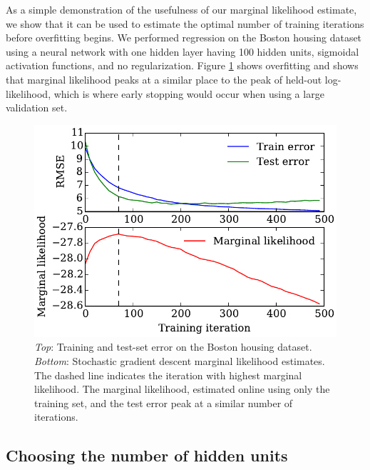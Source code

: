\documentclass[]{article}
\begin{document}
As a simple demonstration of the usefulness of our marginal likelihood estimate, we show that it can be used to estimate the optimal number of training iterations before overfitting begins.
We performed regression on the Boston housing dataset 
using a neural network with one hidden layer having 100 hidden units, sigmoidal activation functions, and no regularization.
Figure \ref{fig:housing} shows overfitting and shows that marginal likelihood peaks at a similar place to the peak of held-out log-likelihood, which is where early stopping would occur when using a large validation set.

\begin{figure}[h!]
\begin{center}
\includegraphics[width=\columnwidth]{../experiments/2015_03_01_housing/2/marglik.pdf}
\vskip -0.1in
\caption{\emph{Top}: Training and test-set error on the Boston housing dataset.
\emph{Bottom}: Stochastic gradient descent marginal likelihood estimates.
The dashed line indicates the iteration with highest marginal likelihood.
The marginal likelihood, estimated online using only the training set, and the
test error peak at a similar number of iterations.}
\label{fig:housing}
\end{center}
\end{figure}



\subsection{Choosing the number of hidden units}
\end{document}
